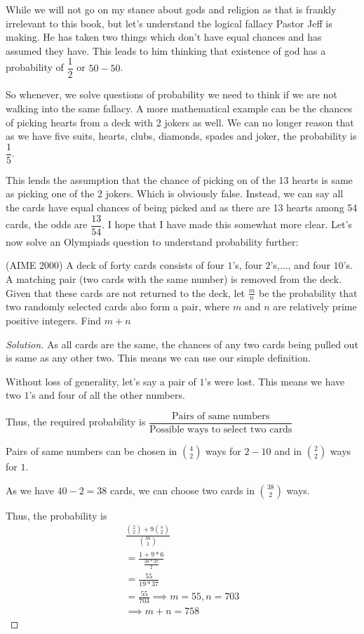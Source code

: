 While we will not go on my stance about gods and religion as that is frankly irrelevant to this book, but let's understand
the logical fallacy Pastor Jeff is making. He has taken two things which don't have equal chances and has
assumed they have. This leads to him thinking that existence of god has a probability of $\dfrac{1}{2}$ or $50-50$.\par
So whenever, we solve questions of probability we need to think if we are not walking into the same fallacy. A 
more mathematical example can be the chances of picking hearts from a deck with 2 jokers as well. We can no longer 
reason that as we have five suits, hearts, clubs, diamonds, spades and joker, the probability is $\dfrac{1}{5}$.\par
This lends the assumption that the chance of picking on of the 13 hearts is same as picking one of the 2 jokers.
Which is obviously false. Instead, we can say all the cards have equal chances of being picked and as there are 13 hearts
among 54 cards, the odds are $\dfrac{13}{54}$. I hope that I have made this somewhat more clear.
Let's now solve an Olympiads question to understand probability further:
\begin{example}
    (AIME 2000) A deck of forty cards consists of 
    four $1$’s, four $2$’s,..., and four $10$’s. A matching 
    pair (two cards with the same number) is removed from the deck. 
    Given that these cards are not returned to the deck, let $\frac{m}{n}$ be the
     probability that two randomly selected cards also form a pair, where $m$ and $n$ are 
     relatively prime positive integers. Find $m + n$
\end{example}
\begin{proof}
    [Solution]
    As all cards are the same, the chances of any two cards being pulled out is same as any other two. This means we can use our simple definition.\par
    Without loss of generality, let's say a pair of $1$'s were lost. This means we have two $1$'s and four of all the other numbers.\par
    Thus, the required probability is $\dfrac{\text{Pairs of same numbers}}{\text{Possible ways to select two cards}}$\par
    Pairs of same numbers can be chosen in $\binom{4}{2}$ ways for $2-10$ and in $\binom{2}{2}$ ways for $1$.\par
    As we have $40-2=38$ cards, we can choose two cards in $\binom{38}{2}$ ways.\par
    Thus, the probability is
    \begin{align*}
    \frac{\binom{2}{2}+9\binom{4}{2}}{\binom{38}{2}}\\
    = \frac{1+9*6}{\frac{38*37}{2}}\\
    = \frac{55}{19*37}\\
    = \frac{55}{703}
    \implies m=55, n=703\\
    \implies m+n=758
    \end{align*}
\end{proof}

